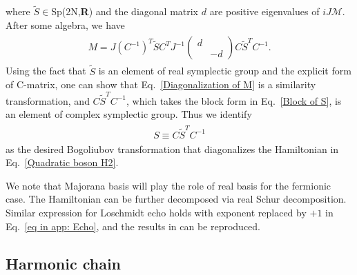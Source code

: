 where $\tilde{S}\in$Sp(2N,{\bf R}) and the diagonal matrix $d$ are positive eigenvalues of $iJ\mathcal{M}$. After some algebra, we have
\begin{eqnarray}\begin{aligned}
\label{Diagonalization of M}
M=J(C^{-1})^T\tilde{S}C^TJ^{-1}\left(\begin{array}{ccc}
d\\
&-d
\end{array}\right)C\tilde{S}^TC^{-1}.
\end{aligned}\end{eqnarray}
Using the fact that $\tilde{S}$ is an element of real symplectic group and the explicit form of C-matrix, one can show that Eq.~\eqref{Diagonalization of M} is a similarity transformation, and $C\tilde{S}^TC^{-1}$, which takes the block form in Eq.~\eqref{Block of S}, is an element of complex symplectic group. Thus we identify 
\begin{eqnarray*}\begin{aligned}
S\equiv C\tilde{S}^TC^{-1}
\end{aligned}\end{eqnarray*}
as the desired Bogoliubov transformation that diagonalizes the Hamiltonian in Eq.~\eqref{Quadratic boson H2}. 

We note that Majorana basis will play the role of real basis for the fermionic case. The Hamiltonian can be further decomposed via real Schur decomposition. Similar expression for Loschmidt echo holds with exponent replaced by $+1$ in Eq.~\eqref{eq in app: Echo}, and the results in  can be reproduced.  

\subsection{Harmonic chain}
\label{app: Harmonic chain}

